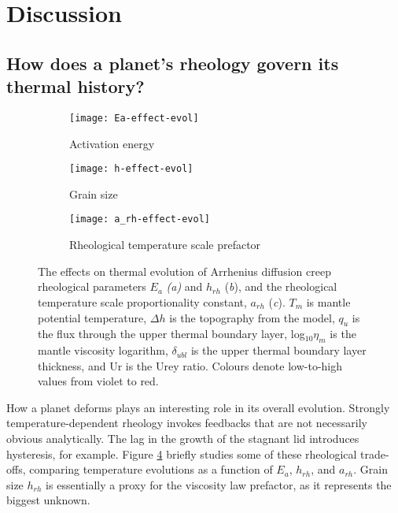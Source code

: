 \section{Discussion}

\subsection{How does a planet's rheology govern its thermal history?}

\begin{figure}
\centering
\begin{subfigure}{.5\textwidth}
  \centering
  \texttt{[image: Ea-effect-evol]}
  \caption{Activation energy}
  \label{fig:Ea}
\end{subfigure}%
\begin{subfigure}{.5\textwidth}
  \centering
  \texttt{[image: h-effect-evol]}
  \caption{Grain size}
  \label{fig:h_rh} 
\end{subfigure} 

\begin{subfigure}{.5\textwidth}
  \centering
  \texttt{[image: a\_rh-effect-evol]}
  \caption{Rheological temperature scale prefactor}
  \label{fig:a_rh} 
\end{subfigure}
\caption{The effects on thermal evolution of Arrhenius diffusion creep rheological parameters $E_a$ \textit{(a)} and $h_{rh}$ (\textit{b}), and the rheological temperature scale proportionality constant, $a_{rh}$ (\textit{c}). $T_m$ is mantle potential temperature, $\Delta h$ is the topography from the \citet{Parsons1983} model, $q_{u}$ is the flux through the upper thermal boundary layer, log$_{10}\eta_m$ is the mantle viscosity logarithm, $\delta_{ubl}$ is the upper thermal boundary layer thickness, and Ur is the Urey ratio. Colours denote low-to-high values from violet to red.}
\label{fig:rheology}
\end{figure}

How a planet deforms plays an interesting role in its overall evolution. Strongly temperature-dependent rheology invokes feedbacks that are not necessarily obvious analytically. The lag in the growth of the stagnant lid introduces hysteresis, for example. Figure \ref{fig:rheology} briefly studies some of these rheological trade-offs, comparing temperature evolutions as a function of $E_a$, $h_{rh}$, and $a_{rh}$. Grain size $h_{rh}$ is essentially a proxy for the viscosity law prefactor, as it represents the biggest unknown.


